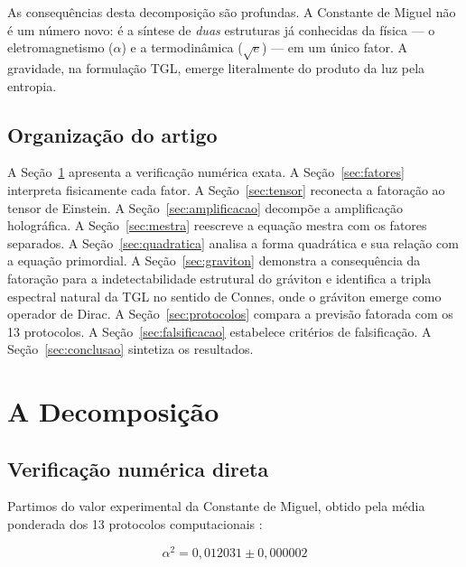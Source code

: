 \documentclass[12pt,a4paper,twoside]{article}
\newcommand{\alphaii}{\alpha^{2}}
\begin{document}
As consequências desta decomposição são profundas. A Constante de Miguel não é um número novo: é a síntese de \textit{duas} estruturas já conhecidas da física --- o eletromagnetismo ($\alpha$) e a termodinâmica ($\sqrt{e}$) --- em um único fator. A gravidade, na formulação TGL, emerge literalmente do produto da luz pela entropia.

\subsection{Organização do artigo}

A Seção~\ref{sec:decomposicao} apresenta a verificação numérica exata. A Seção~\ref{sec:fatores} interpreta fisicamente cada fator. A Seção~\ref{sec:tensor} reconecta a fatoração ao tensor de Einstein. A Seção~\ref{sec:amplificacao} decompõe a amplificação holográfica. A Seção~\ref{sec:mestra} reescreve a equação mestra com os fatores separados. A Seção~\ref{sec:quadratica} analisa a forma quadrática e sua relação com a equação primordial. A Seção~\ref{sec:graviton} demonstra a consequência da fatoração para a indetectabilidade estrutural do gráviton e identifica a tripla espectral natural da TGL no sentido de Connes, onde o gráviton emerge como operador de Dirac. A Seção~\ref{sec:protocolos} compara a previsão fatorada com os 13 protocolos. A Seção~\ref{sec:falsificacao} estabelece critérios de falsificação. A Seção~\ref{sec:conclusao} sintetiza os resultados.



\section{A Decomposição}
\label{sec:decomposicao}

\subsection{Verificação numérica direta}

Partimos do valor experimental da Constante de Miguel, obtido pela média ponderada dos 13 protocolos computacionais \cite{Miguel2026Fronteira}:

\begin{equation}
\alphaii = 0{,}012031 \pm 0{,}000002
\end{equation}
\end{document}
